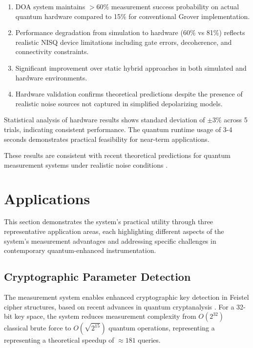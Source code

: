 \documentclass[journal]{IEEEtran}
\begin{document}
\begin{enumerate}
\item DOA system maintains $>60\%$ measurement success probability on actual quantum hardware compared to 15\% for conventional Grover implementation.
\item Performance degradation from simulation to hardware (60\% vs 81\%) reflects realistic NISQ device limitations including gate errors, decoherence, and connectivity constraints.
\item Significant improvement over static hybrid approaches in both simulated and hardware environments.
\item Hardware validation confirms theoretical predictions despite the presence of realistic noise sources not captured in simplified depolarizing models.
\end{enumerate}

Statistical analysis of hardware results shows standard deviation of $\pm 3\%$ across 5 trials, indicating consistent performance. The quantum runtime usage of 3-4 seconds demonstrates practical feasibility for near-term applications.

These results are consistent with recent theoretical predictions for quantum measurement systems under realistic noise conditions \cite{AbuGhanem:2024vwb, 10041809}.

\section{Applications}

This section demonstrates the system's practical utility through three representative application areas, each highlighting different aspects of the system's measurement advantages and addressing specific challenges in contemporary quantum-enhanced instrumentation.

\subsection{Cryptographic Parameter Detection}

The measurement system enables enhanced cryptographic key detection in Feistel cipher structures, based on recent advances in quantum cryptanalysis \cite{10.1007/978-3-319-70697-9_6, Kaplan_2016}. {For a 32-bit key space, the system reduces measurement complexity from $O(2^{32})$ classical brute force to $O(\sqrt{2^{15}})$ quantum operations, representing a representing a theoretical speedup of $\approx 181$ queries.}
\end{document}
